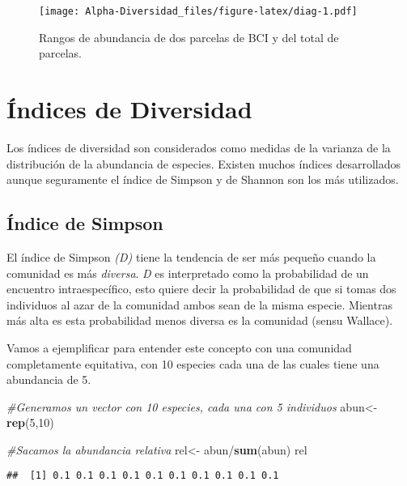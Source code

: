 \documentclass[]{book}
\newenvironment{Shaded}{\begin{snugshade}}{\end{snugshade}}
\newcommand{\KeywordTok}[1]{\textcolor[rgb]{0.13,0.29,0.53}{\textbf{{#1}}}}
\newcommand{\DecValTok}[1]{\textcolor[rgb]{0.00,0.00,0.81}{{#1}}}
\newcommand{\StringTok}[1]{\textcolor[rgb]{0.31,0.60,0.02}{{#1}}}
\newcommand{\CommentTok}[1]{\textcolor[rgb]{0.56,0.35,0.01}{\textit{{#1}}}}
\newcommand{\NormalTok}[1]{{#1}}
\begin{document}
\begin{figure}[htbp]
\centering
\texttt{[image: Alpha-Diversidad\_files/figure-latex/diag-1.pdf]}
\caption{\label{fig:diag}Rangos de abundancia de dos parcelas de BCI y del
total de parcelas.}
\end{figure}

\section{Índices de Diversidad}\label{indices-de-diversidad}

Los índices de diversidad son considerados como medidas de la varianza
de la distribución de la abundancia de especies. Existen muchos índices
desarrollados aunque seguramente el índice de Simpson y de Shannon son
los más utilizados.

\subsection{Índice de Simpson}\label{indice-de-simpson}

El índice de Simpson \emph{(D)} tiene la tendencia de ser más pequeño
cuando la comunidad es más \emph{diversa}. \emph{D} es interpretado como
la probabilidad de un encuentro intraespecífico, esto quiere decir la
probabilidad de que si tomas dos individuos al azar de la comunidad
ambos sean de la misma especie. Mientras más alta es esta probabilidad
menos diversa es la comunidad (sensu Wallace).

Vamos a ejemplificar para entender este concepto con una comunidad
completamente equitativa, con 10 especies cada una de las cuales tiene
una abundancia de 5.

\begin{Shaded}
\begin{Highlighting}[]
\CommentTok{#Generamos un vector con 10 especies, cada una con 5 individuos}
\NormalTok{abun<-}\StringTok{ }\KeywordTok{rep}\NormalTok{(}\DecValTok{5}\NormalTok{,}\DecValTok{10}\NormalTok{)}

\CommentTok{#Sacamos la abundancia relativa}
\NormalTok{rel<-}\StringTok{ }\NormalTok{abun/}\KeywordTok{sum}\NormalTok{(abun)}
\NormalTok{rel}
\end{Highlighting}
\end{Shaded}

\begin{verbatim}
##  [1] 0.1 0.1 0.1 0.1 0.1 0.1 0.1 0.1 0.1 0.1
\end{verbatim}
\end{document}
